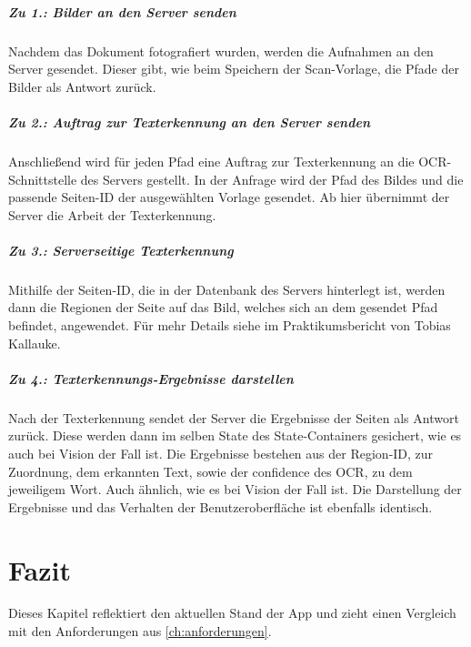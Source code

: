 \documentclass[notables, nomenclature, oneside, 150]{HSMW-Thesis}
\begin{document}
				\paragraph*{Zu 1.: Bilder an den Server senden}
				Nachdem das Dokument fotografiert wurden, werden die Aufnahmen an den Server gesendet. Dieser gibt, wie beim Speichern der Scan-Vorlage, die Pfade der Bilder als Antwort zurück. 
				
				\paragraph*{Zu 2.: Auftrag zur Texterkennung an den Server senden}
				Anschließend wird für jeden Pfad eine Auftrag zur Texterkennung an  die OCR-Schnittstelle des Servers gestellt. In der Anfrage wird der Pfad des Bildes und die passende Seiten-ID der ausgewählten Vorlage gesendet. Ab hier übernimmt der Server die Arbeit der Texterkennung.
				
				\paragraph*{Zu 3.: Serverseitige Texterkennung}
				Mithilfe der Seiten-ID, die in der Datenbank des Servers hinterlegt ist, werden dann die Regionen der Seite auf das Bild, welches sich an dem gesendet Pfad befindet, angewendet. Für mehr Details siehe im Praktikumsbericht von Tobias Kallauke. 
				
				\paragraph*{Zu 4.: Texterkennungs-Ergebnisse darstellen}
				Nach der Texterkennung sendet der Server die Ergebnisse der Seiten als Antwort zurück. Diese werden dann im selben State des State-Containers gesichert, wie es auch bei Vision der Fall ist. Die Ergebnisse bestehen aus der Region-ID, zur Zuordnung, dem erkannten Text, sowie der confidence des OCR, zu dem jeweiligem Wort. Auch ähnlich, wie es bei Vision der Fall ist. Die Darstellung der Ergebnisse und das Verhalten der Benutzeroberfläche ist ebenfalls identisch.      


\chapter{Fazit}\label{ch:fazit}
	Dieses Kapitel reflektiert den aktuellen Stand der App und zieht einen Vergleich mit den Anforderungen aus \autoref{ch:anforderungen}.
	
\end{document}
